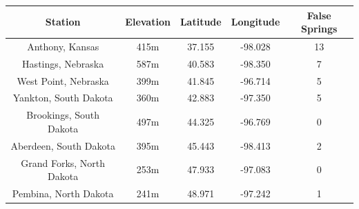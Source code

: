 \documentclass{article}\usepackage[]{graphicx}\usepackage[]{color}
\begin{document}
\begin{center}
 \label{tab:title2} 
\begin{tabular}{c c c c c}
\hline
Station & Elevation & Latitude & Longitude & False Springs \\
\hline
Anthony, Kansas & 415m & 37.155 & -98.028 & 13 \\
Hastings, Nebraska & 587m & 40.583 & -98.350  & 7 \\
West Point, Nebraska & 399m & 41.845 & -96.714 & 5 \\
Yankton, South Dakota & 360m & 42.883 & -97.350 & 5 \\
Brookings, South Dakota & 497m & 44.325 & -96.769 & 0 \\
Aberdeen, South Dakota & 395m & 45.443 & -98.413 & 2 \\
Grand Forks, North Dakota & 253m & 47.933 & -97.083 & 0 \\
Pembina, North Dakota & 241m & 48.971 & -97.242 & 1 \\
\hline
\end{tabular}
\end{center}




\end{document}
